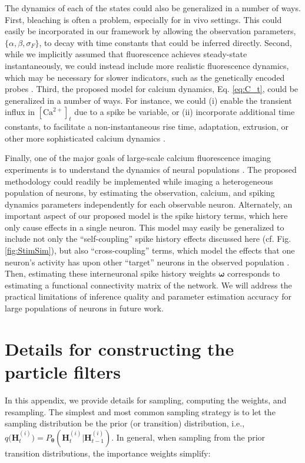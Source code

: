 \documentclass[10pt]{article}
\providecommand{\ve}[1]{\boldsymbol{#1}}
\providecommand{\ve}[1]{\boldsymbol{#1}}
\newcommand{\thetn}{\ve{\theta}}
\newcommand{\p}{P_{\thetn}}
\newcommand{\q}{q\big(\ve{H}_t^{(i)}\big)}
\newcommand{\Ca}{[\text{Ca}^{2+}]}
\begin{document}
The dynamics of each of the states could also be generalized in a number of ways. First, bleaching is often a problem, especially for in vivo settings.  This could easily be incorporated in our framework by allowing the observation parameters, $\{\alpha, \beta, \sigma_F\}$, to decay with time constants that could be inferred directly. Second, while we implicitly assumed that fluorescence achieves steady-state instantaneously, we could instead include more realistic fluorescence dynamics, which may be necessary for slower indicators, such as the genetically encoded probes \cite{TayYue07}. Third, the proposed model for calcium dynamics, Eq. \ref{eq:C_t}, could be generalized in a number of ways.  For instance, we could (i) enable the transient influx in $\Ca_t$ due to a spike be variable, or (ii) incorporate additional time constants, to facilitate a non-instantaneous rise time, adaptation, extrusion, or other more sophisticated calcium dynamics \cite{TsienTsien90}.   

Finally, one of the major goals of large-scale calcium fluorescence imaging experiments is to understand the dynamics of neural populations \cite{YusteKatz91, IkegayaYuste04}. The proposed methodology could readily be implemented while imaging a heterogeneous population of neurons, by estimating the observation, calcium, and spiking dynamics parameters independently for each observable neuron. Alternately, an important aspect of our proposed model is the spike history terms, which here only cause effects in a single neuron.  This model may easily be generalized to include not only the ``self-coupling'' spike history effects discussed here (cf. Fig. \ref{fig:StimSim}), but also ``cross-coupling'' terms, which model the effects that one neuron's activity has upon other ``target'' neurons in the observed population \cite{Paninski04c, TruccoloBrown05, Pillow08}.  Then, estimating these interneuronal spike history weights $\ve{\omega}$ corresponds to estimating a functional connectivity matrix of the network.  We will address the practical limitations of inference quality and parameter estimation accuracy for large populations of neurons in future work.

\newpage \appendix
\section{Details for constructing the particle filters} \label{sec:cond_samp}

In this appendix, we provide details for sampling, computing the weights, and resampling.  The simplest and most common sampling strategy is to let the sampling distribution be the prior (or transition) distribution, i.e., $\q=\p(\ve{H}_t^{(i)} | \ve{H}_{t-1}^{(i)})$. In general, when sampling from the prior transition distributions, the importance weights simplify:
\end{document}
